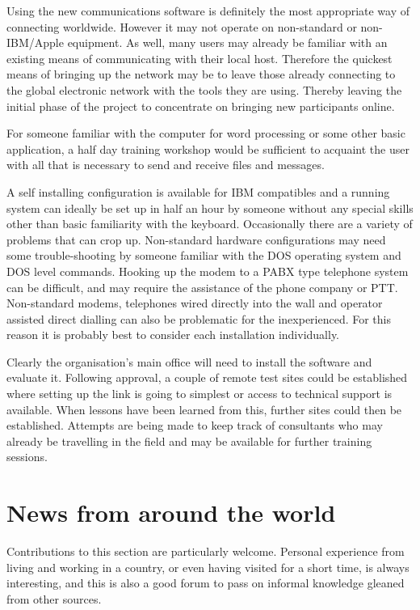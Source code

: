 Using the new communications software is definitely the most appropriate
way of connecting worldwide. However it may not operate on non-standard or
non-IBM/Apple equipment. As well, many  users may already be
familiar with an existing means of communicating with their local host.
Therefore the quickest means of bringing up the network may be to leave
those already connecting to the global electronic network with the tools
they are using. Thereby leaving the initial phase of the project to
concentrate on bringing new participants online.

For someone familiar with the computer for word processing or some other
basic application, a half day training workshop would be sufficient to
acquaint the user with all that is necessary to send and receive files and
messages.

A self installing configuration is available for IBM compatibles and a
running system can ideally be set up in half an hour by someone without any
special skills other than basic familiarity with the keyboard. Occasionally
there are a variety of problems that can crop up. Non-standard hardware
configurations may need some trouble-shooting by someone familiar with the
DOS operating system and DOS level commands. Hooking up the modem to a PABX
type telephone system can be difficult, and may require the assistance of
the phone company or PTT. Non-standard modems, telephones wired directly
into the wall and operator assisted direct dialling can also be problematic
for the inexperienced. For this reason it is probably best to consider each
installation individually.

Clearly the organisation's main office will need to install the software
and evaluate it. Following approval, a couple of remote test sites could be
established where setting up the link is going to simplest or access to
technical support is available. When lessons have been learned from this,
further sites could then be established. Attempts are being made to keep
track of consultants who may already be travelling in the field and may be
available for further training sessions.

\section{News from around the world}
Contributions to this section are particularly welcome. Personal
experience from living and working in a country, or even having
visited for a short time, is always interesting, and this is also a
good forum to pass on informal knowledge gleaned from other sources.


